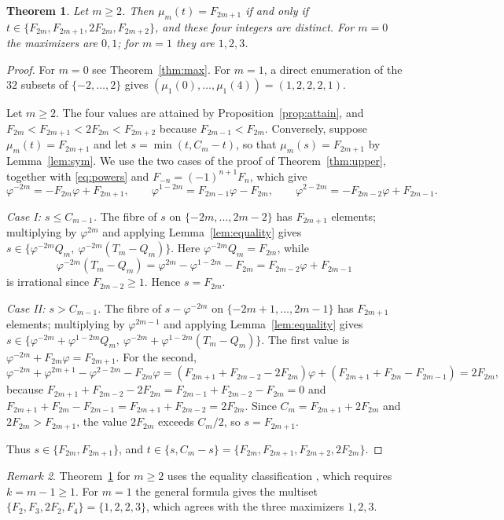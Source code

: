 \documentclass[11pt]{amsart}
\newtheorem{theorem}{Theorem}[section]
\theoremstyle{definition}
\theoremstyle{remark}
\newtheorem{remark}[theorem]{Remark}
\numberwithin{equation}{section}
\begin{document}
\begin{theorem}\label{thm:argmax}
Let $m\ge2$. Then $\mu_m(t)=F_{2m+1}$ if and only if $t\in\{F_{2m},F_{2m+1},2F_{2m},F_{2m+2}\}$, and
these four integers are distinct. For $m=0$ the maximizers are $0,1$; for $m=1$ they are $1,2,3$.
\end{theorem}

\begin{proof}
For $m=0$ see Theorem~\ref{thm:max}. For $m=1$, a direct enumeration of the $32$ subsets of
$\{-2,\dots,2\}$ gives $(\mu_1(0),\dots,\mu_1(4))=(1,2,2,2,1)$.

Let $m\ge2$. The four values are attained by Proposition~\ref{prop:attain}, and
$F_{2m}<F_{2m+1}<2F_{2m}<F_{2m+2}$ because $F_{2m-1}<F_{2m}$. Conversely, suppose
$\mu_m(t)=F_{2m+1}$ and let $s=\min(t,C_m-t)$, so that $\mu_m(s)=F_{2m+1}$ by
Lemma~\ref{lem:sym}. We use the two cases of the proof of Theorem~\ref{thm:upper}, together with
\eqref{eq:powers} and $F_{-n}=(-1)^{n+1}F_n$, which give
\[
  \varphi^{-2m}=-F_{2m}\varphi+F_{2m+1},\qquad \varphi^{1-2m}=F_{2m-1}\varphi-F_{2m},\qquad
  \varphi^{2-2m}=-F_{2m-2}\varphi+F_{2m-1}.
\]

\emph{Case I: $s\le C_{m-1}$.} The fibre of $s$ on $\{-2m,\dots,2m-2\}$ has $F_{2m+1}$ elements;
multiplying by $\varphi^{2m}$ and applying Lemma~\ref{lem:equality} gives
$s\in\{\varphi^{-2m}Q_m,\ \varphi^{-2m}(T_m-Q_m)\}$. Here $\varphi^{-2m}Q_m=F_{2m}$, while
\[
  \varphi^{-2m}(T_m-Q_m)=\varphi^{2m}-\varphi^{1-2m}-F_{2m}=F_{2m-2}\varphi+F_{2m-1}
\]
is irrational since $F_{2m-2}\ge1$. Hence $s=F_{2m}$.

\emph{Case II: $s>C_{m-1}$.} The fibre of $s-\varphi^{-2m}$ on $\{-2m+1,\dots,2m-1\}$ has $F_{2m+1}$
elements; multiplying by $\varphi^{2m-1}$ and applying Lemma~\ref{lem:equality} gives
$s\in\{\varphi^{-2m}+\varphi^{1-2m}Q_m,\ \varphi^{-2m}+\varphi^{1-2m}(T_m-Q_m)\}$. The first value is
$\varphi^{-2m}+F_{2m}\varphi=F_{2m+1}$. For the second,
\[
  \varphi^{-2m}+\varphi^{2m+1}-\varphi^{2-2m}-F_{2m}\varphi
  =(F_{2m+1}+F_{2m-2}-2F_{2m})\varphi+(F_{2m+1}+F_{2m}-F_{2m-1})=2F_{2m},
\]
because $F_{2m+1}+F_{2m-2}-2F_{2m}=F_{2m-1}+F_{2m-2}-F_{2m}=0$ and
$F_{2m+1}+F_{2m}-F_{2m-1}=F_{2m+1}+F_{2m-2}=2F_{2m}$. Since $C_m=F_{2m+1}+2F_{2m}$ and
$2F_{2m}>F_{2m+1}$, the value $2F_{2m}$ exceeds $C_m/2$, so $s=F_{2m+1}$.

Thus $s\in\{F_{2m},F_{2m+1}\}$, and $t\in\{s,C_m-s\}=\{F_{2m},F_{2m+1},F_{2m+2},2F_{2m}\}$.
\end{proof}

\begin{remark}
Theorem~\ref{thm:argmax} for $m\ge2$ uses the equality classification
\cite[Corollary~5.1(i)]{KMP2005}, which requires $k=m-1\ge1$. For $m=1$ the general formula gives
the multiset $\{F_2,F_3,2F_2,F_4\}=\{1,2,2,3\}$, which agrees with the three maximizers $1,2,3$.
\end{remark}
\end{document}
